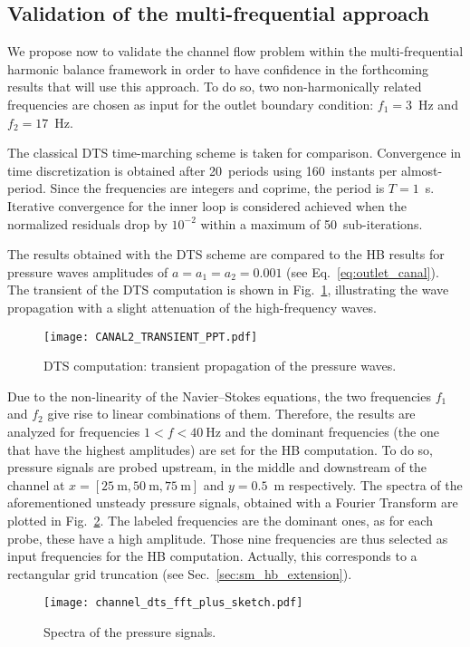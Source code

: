 \subsection{Validation of the multi-frequential approach}
\label{sec:channel_multifreq}

We propose
now to validate the channel flow problem within 
the multi-frequential harmonic balance framework
in order to have confidence in the forthcoming results that
will use this approach.
To do so, two non-harmonically related
frequencies are chosen as input for the outlet boundary condition:
$f_1 = 3$~Hz and $f_2 = 17$~Hz.

The classical DTS time-marching scheme is taken for comparison.
Convergence in time discretization is obtained after 20~periods using
160~instants per almost-period. Since the frequencies are integers and
coprime, the period is $T=1$~s.  Iterative convergence for the
inner loop is considered achieved when the normalized residuals drop
by $10^{-2}$ within a maximum of 50~sub-iterations.

The results obtained with the DTS scheme are compared to the HB
results for pressure waves amplitudes of $a = a_1 = a_2 = 0.001$
(see Eq.~\eqref{eq:outlet_canal}). The
transient of the DTS computation is shown in
Fig.~\ref{fig:canal2_transient}, illustrating the wave propagation
with a slight attenuation of the high-frequency waves.
\begin{figure}[htp]
  \centering
  \texttt{[image: CANAL2\_TRANSIENT\_PPT.pdf]}
  \caption{DTS computation: transient propagation of the pressure waves.}
  \label{fig:canal2_transient}
\end{figure}

Due to the non-linearity of the Navier--Stokes equations, the two frequencies
$f_1$ and $f_2$ give rise to linear combinations of them.
Therefore, the results are analyzed for frequencies $1<f< 40~\textrm{Hz}$ and the
dominant frequencies (the one that have the highest amplitudes) are
set for the HB computation.  To do so, pressure signals are probed
upstream, in the middle and downstream of the channel at
$x=[25~\textrm{m}, 50~\textrm{m}, 75~\textrm{m}]$ and $y=0.5$~m
respectively.  The spectra of the aforementioned unsteady pressure
signals, obtained with a Fourier Transform are plotted in
Fig.~\ref{fig:canal2_dts_fft}.  The labeled frequencies are the
dominant ones, as for each probe, these have a high amplitude. Those
nine frequencies are thus selected as input frequencies for the HB computation.
Actually, this corresponds to a rectangular grid truncation 
(see Sec.~\ref{sec:sm_hb_extension}).
\begin{figure}[htp]
  \centering
  \texttt{[image: channel\_dts\_fft\_plus\_sketch.pdf]}
  \caption{Spectra of the pressure signals.}
  \label{fig:canal2_dts_fft}
\end{figure}

